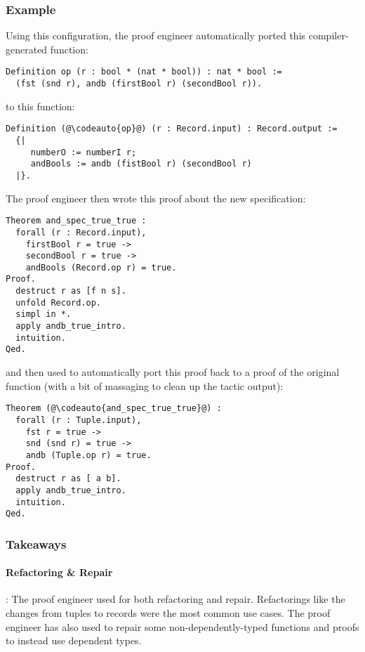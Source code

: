 \subsubsection{Example}
Using this configuration, the proof engineer automatically ported this compiler-generated function:

\begin{lstlisting}
Definition op (r : bool * (nat * bool)) : nat * bool :=
  (fst (snd r), andb (firstBool r) (secondBool r)).
\end{lstlisting}
to this function:

\begin{lstlisting}
Definition (@\codeauto{op}@) (r : Record.input) : Record.output :=
  {|
     numberO := numberI r;
     andBools := andb (fistBool r) (secondBool r)
  |}.
\end{lstlisting}
The proof engineer then wrote this proof about the new specification: %

\begin{lstlisting}
Theorem and_spec_true_true :
  forall (r : Record.input),
    firstBool r = true ->
    secondBool r = true ->
    andBools (Record.op r) = true.
Proof.
  destruct r as [f n s].
  unfold Record.op.
  simpl in *.
  apply andb_true_intro.
  intuition.
Qed.
\end{lstlisting}
and then used \toolname to automatically port this proof back to a proof of the original function
(with a bit of massaging to clean up the tactic output): %

\begin{lstlisting}
Theorem (@\codeauto{and_spec_true_true}@) :
  forall (r : Tuple.input),
    fst r = true ->
    snd (snd r) = true ->
    andb (Tuple.op r) = true.
Proof.
  destruct r as [ a b].
  apply andb_true_intro.
  intuition.
Qed.
\end{lstlisting}

\subsubsection{Takeaways}

\paragraph{Refactoring \& Repair}:
The proof engineer used \toolname for both refactoring and repair.
Refactorings like the changes from tuples to records were the most common use cases.
The proof engineer has also used \toolname to repair some non-dependently-typed
functions and proofs to instead use dependent types.

